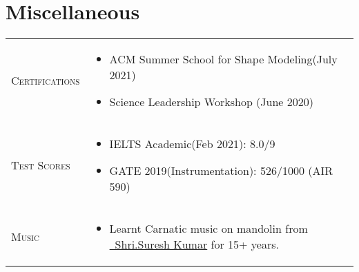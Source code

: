 \documentclass[a4paper,12pt]{article}
\begin{document}
\section{Miscellaneous}
\begin{tabularx}{\linewidth}{@{}l X@{}}
\textsc{Certifications} & \begin{itemize}
    \item ACM Summer School for Shape Modeling(July 2021)
    \item Science Leadership Workshop (June 2020)
\end{itemize}
\\
\textsc{Test Scores}  &  \begin{itemize}
    \item IELTS Academic(Feb 2021): 8.0/9
    \item GATE 2019(Instrumentation): 526/1000 (AIR 590)
\end{itemize}
\\  
\textsc{Music}&
    \begin{itemize}
    \item Learnt Carnatic music on mandolin from \href{https://www.linkedin.com/in/mandolin-suresh-kumar-410577151/?originalSubdomain=in}{\raisebox{-0.05\height}\ Shri.Suresh Kumar} for 15+ years.
\end{itemize}\\
\end{tabularx}
\end{document}
